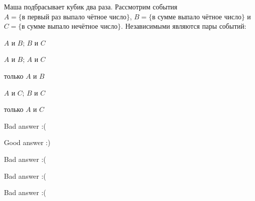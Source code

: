 
\begin{question}
Маша подбрасывает кубик два раза. Рассмотрим события
\(A = \{\text{в первый раз выпало чётное число}\}\),
\(B = \{\text{в сумме выпало чётное число}\}\) и
\(C=\{\text{в сумме выпало нечётное число}\}\). Независимыми являются
пары событий:
\begin{answerlist}
  \item \(A\) и \(B\); \(B\) и \(C\)
  \item \(A\) и \(B\); \(A\) и \(C\)
  \item только \(A\) и \(B\)
  \item \(A\) и \(C\); \(B\) и \(C\)
  \item только \(A\) и \(C\)
\end{answerlist}
\end{question}

\begin{solution}
\begin{answerlist}
  \item Bad answer :(
  \item Good answer :)
  \item Bad answer :(
  \item Bad answer :(
  \item Bad answer :(
\end{answerlist}
\end{solution}

